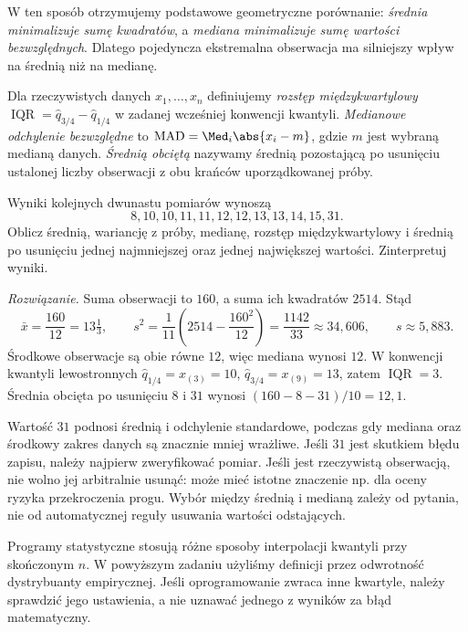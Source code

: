 W ten sposób otrzymujemy podstawowe geometryczne porównanie: \emph{średnia minimalizuje sumę kwadratów}, a \emph{mediana minimalizuje sumę wartości bezwzględnych}. Dlatego pojedyncza ekstremalna obserwacja ma silniejszy wpływ na średnią niż na medianę.

\begin{definicja}
Dla rzeczywistych danych $x_1,\ldots,x_n$ definiujemy \emph{rozstęp międzykwartylowy} $\operatorname{IQR}=\widehat q_{3/4}-\widehat q_{1/4}$ w zadanej wcześniej konwencji kwantyli. \emph{Medianowe odchylenie bezwzględne} to $\operatorname{MAD}=\Med_i\abs{x_i-m}$, gdzie $m$ jest wybraną medianą danych. \emph{Średnią obciętą} nazywamy średnią pozostającą po usunięciu ustalonej liczby obserwacji z obu krańców uporządkowanej próby.
\end{definicja}

\begin{zadanie}\label{zad:outlier}
Wyniki kolejnych dwunastu pomiarów wynoszą
\[
8,10,10,11,11,12,12,13,13,14,15,31.
\]
Oblicz średnią, wariancję z próby, medianę, rozstęp międzykwartylowy i średnią po usunięciu jednej najmniejszej oraz jednej największej wartości. Zinterpretuj wyniki.
\par\emph{Rozwiązanie.} Suma obserwacji to $160$, a suma ich kwadratów $2514$. Stąd
\[
\bar x=\frac{160}{12}=13\tfrac13,\qquad
s^2=\frac1{11}\left(2514-\frac{160^2}{12}\right)=\frac{1142}{33}\approx34{,}606,
\qquad s\approx5{,}883.
\]
Środkowe obserwacje są obie równe $12$, więc mediana wynosi $12$. W konwencji kwantyli lewostronnych $\widehat q_{1/4}=x_{(3)}=10$, $\widehat q_{3/4}=x_{(9)}=13$, zatem $\operatorname{IQR}=3$. Średnia obcięta po usunięciu $8$ i $31$ wynosi $(160-8-31)/10=12{,}1$.

Wartość $31$ podnosi średnią i odchylenie standardowe, podczas gdy mediana oraz środkowy zakres danych są znacznie mniej wrażliwe. Jeśli $31$ jest skutkiem błędu zapisu, należy najpierw zweryfikować pomiar. Jeśli jest rzeczywistą obserwacją, nie wolno jej arbitralnie usunąć: może mieć istotne znaczenie np. dla oceny ryzyka przekroczenia progu. Wybór między średnią i medianą zależy od pytania, nie od automatycznej reguły usuwania wartości odstających.
\end{zadanie}

\begin{uwaga}
Programy statystyczne stosują różne sposoby interpolacji kwantyli przy skończonym $n$. W powyższym zadaniu użyliśmy definicji przez odwrotność dystrybuanty empirycznej. Jeśli oprogramowanie zwraca inne kwartyle, należy sprawdzić jego ustawienia, a nie uznawać jednego z wyników za błąd matematyczny.
\end{uwaga}

